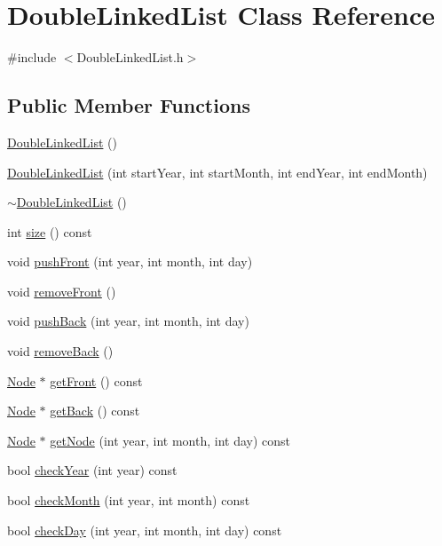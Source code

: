 \hypertarget{classDoubleLinkedList}{\section{Double\-Linked\-List Class Reference}
\label{classDoubleLinkedList}
}


{\ttfamily \#include $<$Double\-Linked\-List.\-h$>$}

\subsection*{Public Member Functions}
\begin{DoxyCompactItemize}
\item 
\hyperlink{classDoubleLinkedList_a7e2c72978120a51da2251e378ef1892c}{Double\-Linked\-List} ()
\item 
\hyperlink{classDoubleLinkedList_aca14acc73e64f2cf121f1a9f06f37693}{Double\-Linked\-List} (int start\-Year, int start\-Month, int end\-Year, int end\-Month)
\item 
\hyperlink{classDoubleLinkedList_ab808039dac47f1f62d00fcf0951550c5}{$\sim$\-Double\-Linked\-List} ()
\item 
int \hyperlink{classDoubleLinkedList_aa5a9a72733c34832f237cca418ec525a}{size} () const 
\item 
void \hyperlink{classDoubleLinkedList_ae4d516bcfeea73b92b9cb927c3a157c7}{push\-Front} (int year, int month, int day)
\item 
void \hyperlink{classDoubleLinkedList_a436c04186fe23d797cae9f89eb1ae579}{remove\-Front} ()
\item 
void \hyperlink{classDoubleLinkedList_a9f5ff04eb32e7fa3e37734754a98df80}{push\-Back} (int year, int month, int day)
\item 
void \hyperlink{classDoubleLinkedList_aa142f7151ffc4f93aa7e5fb111dbf356}{remove\-Back} ()
\item 
\hyperlink{classNode}{Node} $\ast$ \hyperlink{classDoubleLinkedList_af7a43fcd47e701812ec7282e750d66ca}{get\-Front} () const 
\item 
\hyperlink{classNode}{Node} $\ast$ \hyperlink{classDoubleLinkedList_af37a823cffeb12eeb3f00ffe35a5930f}{get\-Back} () const 
\item 
\hyperlink{classNode}{Node} $\ast$ \hyperlink{classDoubleLinkedList_a9d4043921a43ae60db5f44805c8772ab}{get\-Node} (int year, int month, int day) const 
\item 
bool \hyperlink{classDoubleLinkedList_a55b1b4c923c7cb7ed49c131287263b2a}{check\-Year} (int year) const 
\item 
bool \hyperlink{classDoubleLinkedList_a0d87703266d9a88738013e35e4e587e4}{check\-Month} (int year, int month) const 
\item 
bool \hyperlink{classDoubleLinkedList_ae1c0896583217d3a8d423711dabbb375}{check\-Day} (int year, int month, int day) const 
\end{DoxyCompactItemize}
